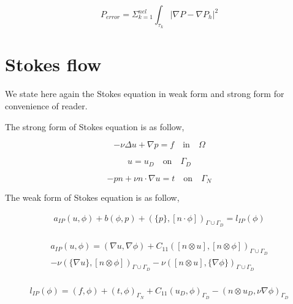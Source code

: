 \documentclass[a4paper,12pt]{book}
\begin{document}
\begin{equation}
P_{error} = \Sigma_{k=1}^{nel} \int_{\tau_k} |\nabla P - \nabla P_h|^2
\end{equation}

\section{Stokes flow}\cite{white} \label{Stokes_flow}

We state here again the Stokes equation in weak form and strong form for convenience of reader.

The strong form of Stokes equation is as follow,

\begin{equation} \label{stokes_strong_form}
-\nu \Delta u + \nabla p = f \quad \textrm{in} \quad \Omega
\end{equation}

\begin{equation} \label{dirichlet condition stokes}
u = u_D \quad \textrm{on} \quad \Gamma_D
\end{equation}

\begin{equation} \label{neumann condition stokes}
-pn + \nu n \cdot \nabla u = t \quad \textrm{on} \quad \Gamma_N
\end{equation}

The weak form of Stokes equation is as follow,

\begin{equation}\label{stokes_weak}
\begin{split}
a_{IP}(u,\phi) + b(\phi,p) + (\{p\},[n\cdot \phi])_{\Gamma \cup \Gamma_D} = l_{IP}(\phi) 
\end{split}
\end{equation}
\\
\begin{equation}
\begin{split}
a_{IP}(u,\phi) = (\nabla u, \nabla \phi) + C_{11} ([n \otimes u],[n \otimes \phi])_{\Gamma \cup \Gamma_D} \\
- \nu (\{\nabla u\},[n \otimes \phi])_{\Gamma \cup \Gamma_D} - \nu ([n \otimes u],\{\nabla \phi\})_{\Gamma \cup \Gamma_D}
\end{split}
\end{equation}
\\
\begin{equation}
\begin{split}
l_{IP}(\phi) = (f,\phi) + (t,\phi)_{\Gamma_N} + C_{11} (u_D,\phi)_{\Gamma_D} - (n \otimes u_D, \nu \nabla \phi)_{\Gamma_D}
\end{split}
\end{equation}
\end{document}
